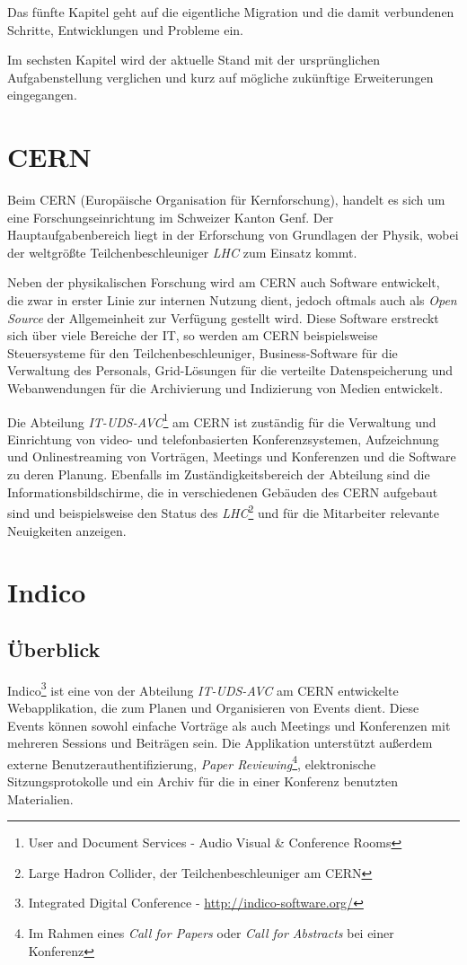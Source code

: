 Das fünfte Kapitel geht auf die eigentliche Migration und die damit verbundenen Schritte,
Entwicklungen und Probleme ein.

Im sechsten Kapitel wird der aktuelle Stand mit der ursprünglichen Aufgabenstellung verglichen und
kurz auf mögliche zukünftige Erweiterungen eingegangen.


\section{CERN}

Beim CERN (Europäische Organisation für Kernforschung), handelt es sich um eine
Forschungseinrichtung im Schweizer Kanton Genf. Der Hauptaufgabenbereich liegt in der Erforschung
von Grundlagen der Physik, wobei der weltgrößte Teilchenbeschleuniger \emph{LHC} zum Einsatz kommt.

Neben der physikalischen Forschung wird am CERN auch Software entwickelt, die zwar in erster Linie
zur internen Nutzung dient, jedoch oftmals auch als \emph{Open Source} der Allgemeinheit zur Verfügung
gestellt wird. Diese Software erstreckt sich über viele Bereiche der IT, so werden am CERN
beispielsweise Steuersysteme für den Teilchenbeschleuniger, Business-Software für die Verwaltung des
Personals, Grid-Lösungen für die verteilte Datenspeicherung und Webanwendungen für die Archivierung
und Indizierung von Medien entwickelt.

Die Abteilung \emph{IT-UDS-AVC}\footnote{User and Document Services - Audio Visual \& Conference
Rooms} am CERN ist zuständig für die Verwaltung und Einrichtung von video- und telefonbasierten
Konferenzsystemen, Aufzeichnung und Onlinestreaming von Vorträgen, Meetings und Konferenzen und die
Software zu deren Planung. Ebenfalls im Zuständigkeitsbereich der Abteilung sind
die Informationsbildschirme, die in verschiedenen Gebäuden des CERN aufgebaut sind und beispielsweise
den Status des \emph{LHC}\footnote{Large Hadron Collider, der Teilchenbeschleuniger am CERN} und
für die Mitarbeiter relevante Neuigkeiten anzeigen.


\section{Indico}

\subsection{Überblick}
Indico\footnote{Integrated Digital Conference - \href{http://indico-software.org/}{http://indico-software.org/}}
ist eine von der Abteilung \emph{IT-UDS-AVC} am CERN entwickelte Webapplikation, die zum Planen und Organisieren von Events dient. Diese
Events können sowohl einfache Vorträge als auch Meetings und Konferenzen mit mehreren Sessions und
Beiträgen sein. Die Applikation unterstützt außerdem externe Benutzerauthentifizierung, \emph{Paper
Reviewing}\footnote{Im Rahmen eines \emph{Call for Papers} oder \emph{Call for Abstracts} bei einer
Konferenz}, elektronische Sitzungsprotokolle und ein Archiv für die in einer Konferenz benutzten
Materialien. \citep{indico}

